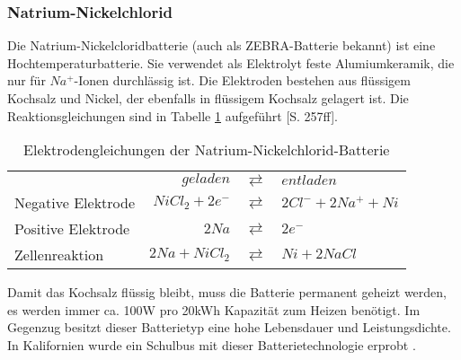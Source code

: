 \subsubsection{Natrium-Nickelchlorid}
Die Natrium-Nickelcloridbatterie (auch als ZEBRA-Batterie bekannt) ist eine Hochtemperaturbatterie. Sie verwendet als Elektrolyt feste Alumiumkeramik, die nur für $Na^+$-Ionen durchlässig ist. Die Elektroden bestehen aus flüssigem Kochsalz und Nickel, der ebenfalls in flüssigem Kochsalz gelagert ist. Die Reaktionsgleichungen sind in Tabelle \ref{ZEBRA} aufgeführt \cite{KiehneBattery}[S. 257ff].

\begin{table}\centering
  \begin{tabularx}{\linewidth}{XrcX}
  	                   &       $geladen$ & $\rightleftarrows$ & $entladen$           \\
  	Negative Elektrode & $NiCl_2 + 2e^-$ & $\rightleftarrows$ & $2Cl^- + 2Na^+ + Ni$ \\
  	Positive Elektrode &           $2Na$ & $\rightleftarrows$ & $2e^-$               \\ \midrule
  	Zellenreaktion     &  $2Na + NiCl_2$ & $\rightleftarrows$ & $Ni + 2NaCl$
  \end{tabularx}
  \caption{Elektrodengleichungen der Natrium-Nickelchlorid-Batterie}
  \label{ZEBRA}
\end{table}

Damit das Kochsalz flüssig bleibt, muss die Batterie permanent geheizt werden, es werden immer ca. 100W pro 20kWh Kapazität zum Heizen benötigt. Im Gegenzug besitzt dieser Batterietyp eine hohe Lebensdauer und Leistungsdichte. In Kalifornien wurde ein Schulbus mit dieser Batterietechnologie erprobt \cite{Electric-Transportation-Department:2004}.


